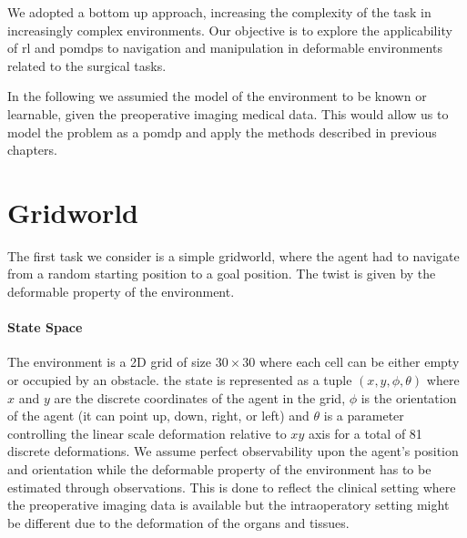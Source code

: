 We adopted a bottom up approach, increasing the complexity of the task in increasingly complex environments.
Our objective is to explore the applicability of \gls{rl} and \glspl{pomdp} to navigation and manipulation 
in deformable environments related to the surgical tasks.

In the following we assumied the model of the environment to be known or learnable, 
given the preoperative imaging medical data. This would allow us to model 
the problem as a \gls{pomdp} and apply the methods described in previous chapters.


\section{Gridworld}
The first task we consider is a simple gridworld, where the agent had to navigate from a random 
starting position to a goal position. The twist is given by the deformable property of the environment.

\paragraph{State Space}

The environment is a 2D grid of size $30 \times 30$ where each cell can be either empty or occupied by an obstacle.
the state is represented as a tuple $(x,y,\phi, \theta)$ where $x$ and $y$ are the discrete coordinates of the agent in the grid, 
$\phi$ is the orientation of the agent (it can point up, down, right, or left) and $\theta$ is a parameter controlling the linear scale deformation  
relative to $xy$ axis for a total of 81 discrete deformations.
We assume perfect observability upon the agent's position and orientation while the deformable property 
of the environment has to be estimated through observations. This is done to reflect the clinical setting where the preoperative 
imaging data is available but the intraoperatory setting might be different due to the deformation of the
organs and tissues. 

